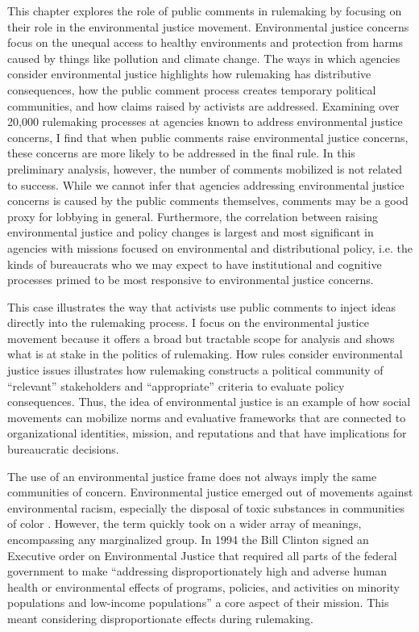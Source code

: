 This chapter 
explores the role of public comments in rulemaking by focusing on their role in the environmental justice movement. Environmental justice concerns focus on the unequal access to healthy environments and protection from harms caused by things like pollution and climate change. The ways in which agencies consider environmental justice highlights how rulemaking has distributive consequences, how the public comment process creates temporary political communities, and how claims raised by activists are addressed. %
Examining over 20,000 rulemaking processes at agencies known to address environmental justice concerns, I find that when public comments raise environmental justice concerns, these concerns are more likely to be addressed in the final rule. In this preliminary analysis, however, the number of comments mobilized is not related to success. While we cannot infer that agencies addressing environmental justice concerns is caused by the public comments themselves, comments may be a good proxy for lobbying in general. Furthermore, the correlation between raising environmental justice and policy changes is largest and most significant in agencies with missions focused on environmental and distributional policy, i.e. the kinds of bureaucrats who we may expect to have institutional and cognitive processes primed to be most responsive to environmental justice concerns.

This case illustrates the way that activists use public comments to inject ideas directly into the rulemaking process. I focus on the environmental justice movement because it offers a broad but tractable scope for analysis and shows what is at stake in the politics of rulemaking.  How rules consider environmental justice issues illustrates how rulemaking constructs a political community of ``relevant'' stakeholders and ``appropriate'' criteria to evaluate policy consequences. Thus, the idea of environmental justice is an example of how social movements can mobilize norms and evaluative frameworks that are connected to organizational identities, mission, and reputations and that have implications for bureaucratic decisions. 

The use of an environmental justice frame does not always imply the same communities of concern. Environmental justice emerged out of movements against environmental racism, especially the disposal of toxic substances in communities of color \citep{Bullard1993}. However, the term quickly took on a wider array of meanings, encompassing any marginalized group. In 1994 the Bill Clinton signed an Executive order on Environmental Justice that required all parts of the federal government to make ``addressing disproportionately high and adverse human health or environmental effects of programs, policies, and activities on minority populations and low-income populations'' a core aspect of their mission. This meant considering disproportionate effects during rulemaking.

